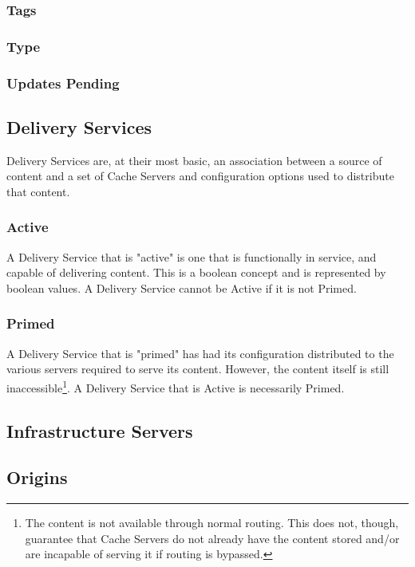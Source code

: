 \subsubsection{Tags}

\subsubsection{Type}

\subsubsection{Updates Pending}

\subsection{Delivery Services}
Delivery Services are, at their most basic, an association between a source of
content and a set of Cache Servers and configuration options used to distribute
that content.

\subsubsection{Active}
A Delivery Service that is "active" is one that is functionally in service, and
capable of delivering content. This is a boolean concept and is represented by
boolean values. A Delivery Service cannot be Active if it is not Primed.

\subsubsection{Primed}
A Delivery Service that is "primed" has had its configuration distributed to the
various servers required to serve its content. However, the content itself is
still inaccessible\footnote{The content is not available through normal routing.
This does not, though, guarantee that Cache Servers do not already have the
content stored and/or are incapable of serving it if routing is bypassed.}. A
Delivery Service that is Active is necessarily Primed.

\subsection{Infrastructure Servers}

\subsection{Origins}

